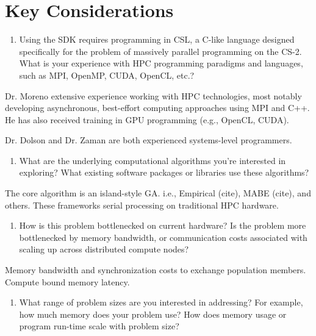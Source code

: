 \section{Key Considerations} \label{sec:key-Considerations}

\begin{enumerate} \itshape
\item Using the SDK requires programming in CSL, a C-like language designed specifically for the problem of massively parallel programming on the CS-2.
What is your experience with HPC programming paradigms and languages, such as MPI, OpenMP, CUDA, OpenCL, etc.?
\end{enumerate}

Dr. Moreno extensive experience working with HPC technologies, most notably developing asynchronous, best-effort computing approaches using MPI and C++.
He has also received training in GPU programming (e.g., OpenCL, CUDA).

Dr. Dolson and Dr. Zaman are both experienced systems-level programmers.

\begin{enumerate}[resume] \itshape
\item What are the underlying computational algorithms you're interested in exploring?
What existing software packages or libraries use these algorithms?
\end{enumerate}

The core algorithm is an island-style GA.
i.e., Empirical (cite), MABE (cite), and others.
These frameworks serial processing on traditional HPC hardware.

\begin{enumerate}[resume] \itshape
\item How is this problem bottlenecked on current hardware?
Is the problem more bottlenecked by memory bandwidth, or communication costs associated with scaling up across distributed compute nodes?
\end{enumerate}

Memory bandwidth and synchronization costs to exchange population members.
Compute bound memory latency.

\begin{enumerate}[resume] \itshape
\item What range of problem sizes are you interested in addressing?
For example, how much memory does your problem use?
How does memory usage or program run-time scale with problem size?
\end{enumerate}

